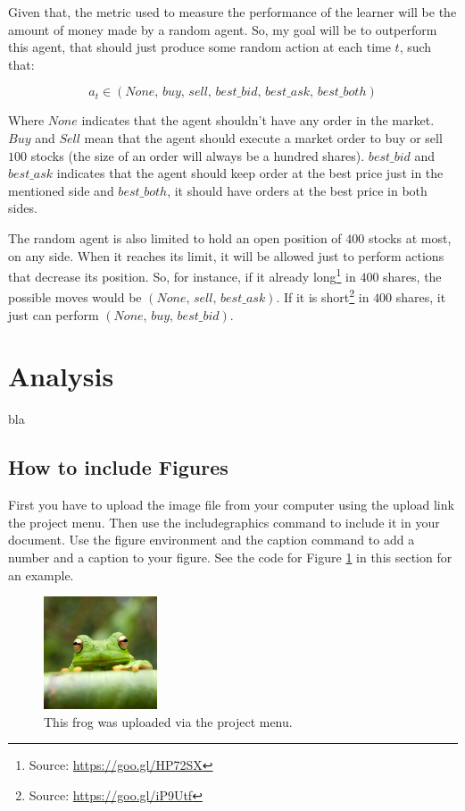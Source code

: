 \documentclass[a4paper]{article}
\begin{document}
Given that, the metric used to measure the performance of the learner will be the amount of money made by a random agent. So, my goal will be to outperform this agent, that should just produce some random action at each time $t$, such that:

$$a_t \in \left (None,\, buy,\, sell,\, best\_bid,\, best\_ask,\, best\_both \right)$$

Where $None$ indicates that the agent shouldn't have any order in the market. $Buy$ and $Sell$ mean that the agent should execute a market order to buy or sell $100$ stocks (the size of an order will always be a hundred shares). $best\_bid$ and $best\_ask$ indicates that the agent should keep order at the best price just in the mentioned side and $best\_both$, it should have orders at the best price in both sides.

The random agent is also limited to hold an open position of $400$ stocks at most, on any side. When it reaches its limit, it will be allowed just to perform actions that decrease its position. So, for instance, if it already long\footnote{Source: \url{https://goo.gl/HP72SX}} in $400$ shares, the possible moves would be $\left (None,\, sell,\, best\_ask \right)$. If it is short\footnote{Source: \url{https://goo.gl/iP9Utf}} in $400$ shares, it just can perform $\left (None,\, buy,\, best\_bid\right)$.



\section{Analysis}

bla

\subsection{How to include Figures}

First you have to upload the image file from your computer using the upload link the project menu. Then use the includegraphics command to include it in your document. Use the figure environment and the caption command to add a number and a caption to your figure. See the code for Figure \ref{fig:frog} in this section for an example.

\begin{figure}
\centering
\includegraphics[width=0.3\textwidth]{frog.jpg}
\caption{\label{fig:frog}This frog was uploaded via the project menu.}
\end{figure}
\end{document}
